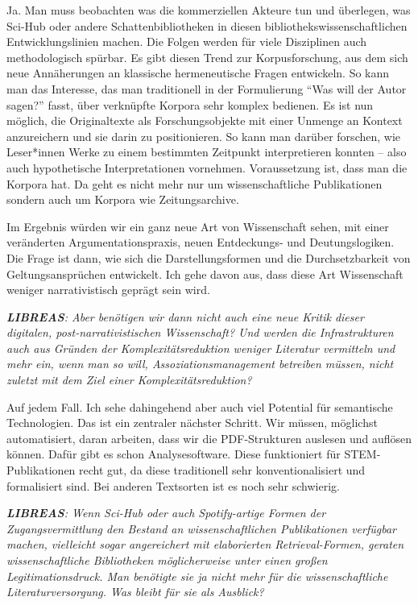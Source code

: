 \documentclass[a4paper,
fontsize=11pt,
oneside,
numbers=noperiodatend,
parskip=half-,
bibliography=totoc,
final
]{scrartcl}
\begin{document}
Ja. Man muss beobachten was die kommerziellen Akteure tun und überlegen,
was Sci-Hub oder andere Schattenbibliotheken in diesen
bibliothekswissenschaftlichen Entwicklungslinien machen. Die Folgen
werden für viele Disziplinen auch methodologisch spürbar. Es gibt diesen
Trend zur Korpusforschung, aus dem sich neue Annäherungen an klassische
hermeneutische Fragen entwickeln. So kann man das Interesse, das man
traditionell in der Formulierung \enquote{Was will der Autor sagen?}
fasst, über verknüpfte Korpora sehr komplex bedienen. Es ist nun
möglich, die Originaltexte als Forschungsobjekte mit einer Unmenge an
Kontext anzureichern und sie darin zu positionieren. So kann man darüber
forschen, wie Leser*innen Werke zu einem bestimmten Zeitpunkt
interpretieren konnten -- also auch hypothetische Interpretationen
vornehmen. Voraussetzung ist, dass man die Korpora hat. Da geht es nicht
mehr nur um wissenschaftliche Publikationen sondern auch um Korpora wie
Zeitungsarchive.

Im Ergebnis würden wir ein ganz neue Art von Wissenschaft sehen, mit
einer veränderten Argumentationspraxis, neuen Entdeckungs- und
Deutungslogiken. Die Frage ist dann, wie sich die Darstellungsformen und
die Durchsetzbarkeit von Geltungsansprüchen entwickelt. Ich gehe davon
aus, dass diese Art Wissenschaft weniger narrativistisch geprägt sein
wird.

\emph{\textbf{LIBREAS}: Aber benötigen wir dann nicht auch eine neue
Kritik dieser digitalen, post-narrativistischen Wissenschaft? Und werden
die Infrastrukturen auch aus Gründen der Komplexitätsreduktion weniger
Literatur vermitteln und mehr ein, wenn man so will,
Assoziationsmanagement betreiben müssen, nicht zuletzt mit dem Ziel
einer Komplexitätsreduktion?}

Auf jedem Fall. Ich sehe dahingehend aber auch viel Potential für
semantische Technologien. Das ist ein zentraler nächster Schritt. Wir
müssen, möglichst automatisiert, daran arbeiten, dass wir die
PDF-Strukturen auslesen und auflösen können. Dafür gibt es schon
Analysesoftware. Diese funktioniert für STEM-Publikationen recht gut, da
diese traditionell sehr konventionalisiert und formalisiert sind. Bei
anderen Textsorten ist es noch sehr schwierig.

\emph{\textbf{LIBREAS}: Wenn Sci-Hub oder auch Spotify-artige Formen der
Zugangsvermittlung den Bestand an wissenschaftlichen Publikationen
verfügbar machen, vielleicht sogar angereichert mit elaborierten
Retrieval-Formen, geraten wissenschaftliche Bibliotheken möglicherweise
unter einen großen Legitimationsdruck. Man benötigte sie ja nicht mehr
für die wissenschaftliche Literaturversorgung. Was bleibt für sie als
Ausblick?}
\end{document}
